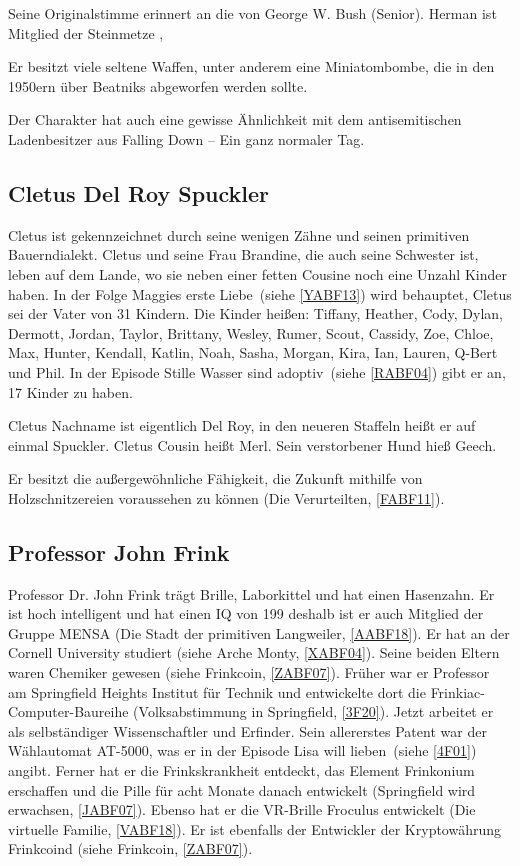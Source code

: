 {Seine Originalstimme erinnert an die von George W. Bush (Senior). Herman ist Mitglied der Steinmetze \cite{uloc},

Er besitzt viele seltene Waffen, unter anderem eine Miniatombombe, die in den 1950ern über Beatniks abgeworfen werden sollte.

Der Charakter hat auch eine gewisse Ähnlichkeit mit dem antisemitischen Ladenbesitzer aus \glqq Falling Down -- Ein ganz normaler Tag\grqq .

\subsection{Cletus Del Roy Spuckler}\label{CletusSpuckler}
Cletus ist gekennzeichnet durch seine wenigen Zähne und seinen primitiven Bauerndialekt. Cletus und seine Frau Brandine, die auch seine Schwester ist, leben auf dem Lande, wo sie neben einer fetten Cousine noch eine Unzahl Kinder haben. In der Folge \glqq Maggies erste Liebe\grqq\ (siehe \ref{YABF13}) wird behauptet, Cletus sei der Vater von 31 Kindern. Die Kinder heißen: Tiffany, Heather, Cody, Dylan, Dermott, Jordan, Taylor, Brittany, Wesley, Rumer, Scout, Cassidy, Zoe, Chloe, Max, Hunter, Kendall, Katlin, Noah, Sasha, Morgan, Kira, Ian, Lauren, Q-Bert und Phil. In der Episode \glqq Stille Wasser sind adoptiv\grqq\ (siehe \ref{RABF04}) gibt er an, 17 Kinder zu haben.

Cletus Nachname ist eigentlich Del Roy, in den neueren Staffeln heißt er auf einmal Spuckler. Cletus Cousin heißt Merl. Sein verstorbener Hund hieß Geech.

Er besitzt die außergewöhnliche Fähigkeit, die Zukunft mithilfe von Holzschnitzereien voraussehen zu können (\glqq Die Verurteilten\grqq , \ref{FABF11}). 


\subsection{Professor John Frink}\label{JohnFrink}
Professor Dr. John Frink trägt Brille, Laborkittel und hat einen Hasenzahn. Er ist hoch intelligent und hat einen IQ von 199 deshalb ist er auch Mitglied der Gruppe MENSA (\glqq Die Stadt der primitiven Langweiler\grqq , \ref{AABF18}). Er hat an der Cornell University studiert (siehe \glqq Arche Monty\grqq, \ref{XABF04}). Seine beiden Eltern waren Chemiker gewesen (siehe \glqq Frinkcoin\grqq, \ref{ZABF07}). Früher war er Professor am Springfield Heights Institut für Technik und entwickelte dort die \glqq Frinkiac\grqq -Computer-Baureihe (\glqq Volksabstimmung in Springfield\grqq , \ref{3F20}). Jetzt arbeitet er als selbständiger Wissenschaftler und Erfinder. Sein allererstes Patent war der Wählautomat AT-5000, was er in der Episode \glqq Lisa will lieben\grqq\ (siehe \ref{4F01}) angibt. Ferner hat er die Frinkskrankheit entdeckt, das Element Frinkonium erschaffen und die Pille für acht Monate danach entwickelt (\glqq Springfield wird erwachsen\grqq , \ref{JABF07}). Ebenso hat er die VR-Brille Froculus entwickelt (\glqq Die virtuelle Familie\grqq, \ref{VABF18}). Er ist ebenfalls der Entwickler der Kryptowährung Frinkcoind (siehe \glqq Frinkcoin\grqq, \ref{ZABF07}).

}

